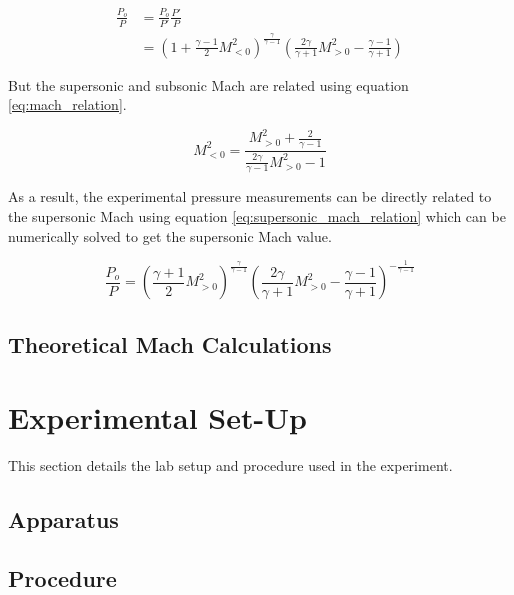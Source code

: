 \documentclass[runningheads]{llncs}
\begin{document}
\begin{align*}
    \frac{P_o}{P} &= \frac{P_o}{P'}\frac{P'}{P} \\
    &= \left(1+\frac{\gamma - 1}{2}M_{<0}^2\right)^{\frac{\gamma}{\gamma - 1}}\left(\frac{2\gamma}{\gamma + 1}M_{>0}^2 - \frac{\gamma - 1}{\gamma + 1}\right)
\end{align*}

\noindent
But the supersonic and subsonic Mach are related using equation \ref{eq:mach_relation}.

\begin{equation}
    M_{<0}^2=\frac{M_{>0}^2+\frac{2}{\gamma - 1}}{\frac{2\gamma}{\gamma - 1}M_{>0}^2 - 1}
    \label{eq:mach_relation}
\end{equation}

\noindent
As a result, the experimental pressure measurements can be directly related to the supersonic Mach using equation \ref{eq:supersonic_mach_relation} which can be numerically solved to get the supersonic Mach value.

\begin{equation}
    \frac{P_o}{P} = \left(\frac{\gamma + 1}{2}M_{>0}^2\right)^{\frac{\gamma}{\gamma - 1}}\left(\frac{2\gamma}{\gamma + 1}M_{>0}^2 - \frac{\gamma - 1}{\gamma + 1}\right)^{-\frac{1}{\gamma - 1}}
    \label{eq:supersonic_mach_relation}
\end{equation}

\subsection{Theoretical Mach Calculations}




\section{Experimental Set-Up}

\noindent
This section details the lab setup and procedure used in the experiment.

\subsection{Apparatus}

\subsection{Procedure}\label{sec:procedure}
\end{document}
